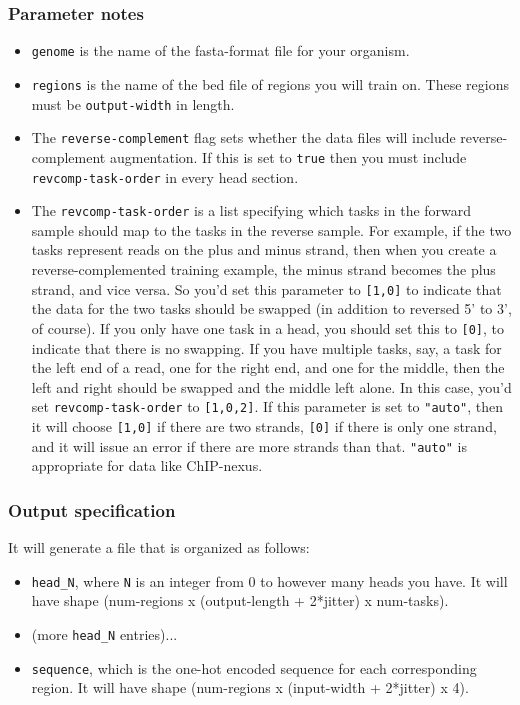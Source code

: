 \documentclass{article}
\begin{document}
\subsubsection{Parameter notes}
\begin{itemize}
    \item \texttt{genome} is the name of the fasta-format file for your organism.
    \item \texttt{regions} is the name of the bed file of regions you will train on. These regions
        must be \texttt{output-width} in length.
    \item The \texttt{reverse-complement} flag sets whether the data files will include
        reverse-complement augmentation. If this is set to \texttt{true} then you must include
        \texttt{revcomp-task-order} in every head section.
    \item The \texttt{revcomp-task-order} is a list specifying which tasks in the forward sample
        should map to the tasks in the reverse sample.
        For example, if the two tasks represent reads on the plus and minus strand, then when you
        create a reverse-complemented training example, the minus strand becomes the plus strand,
        and vice versa.
        So you'd set this parameter to \texttt{[1,0]} to indicate that the data for the two
        tasks should be swapped (in addition to reversed 5' to 3', of course).
        If you only have one task in a head, you should set this to \texttt{[0]}, to indicate
        that there is no swapping.
        If you have multiple tasks, say, a task for the left end of a read, one for the right end,
        and one for the middle, then the left and right should be swapped and the middle left
        alone.
        In this case, you'd set \texttt{revcomp-task-order} to \texttt{[1,0,2]}.
        If this parameter is set to \texttt{"auto"}, then it will choose \texttt{[1,0]} if
        there are two strands, \texttt{[0]} if there is only one strand, and it will issue an
        error if there are more strands than that.
        \texttt{"auto"} is appropriate for data like ChIP-nexus.
\end{itemize}

\subsubsection{Output specification}

It will generate a file that is organized as follows:

\begin{itemize}
    \item \texttt{head\_N}, where \texttt{N} is an integer from 0 to however many heads you have.
        It will have shape (num-regions x (output-length + 2*jitter) x num-tasks).
    \item (more \texttt{head\_N} entries)...
    \item \texttt{sequence}, which is the one-hot encoded sequence for each corresponding
        region. It will have shape (num-regions x (input-width + 2*jitter) x 4).
\end{itemize}
\end{document}
